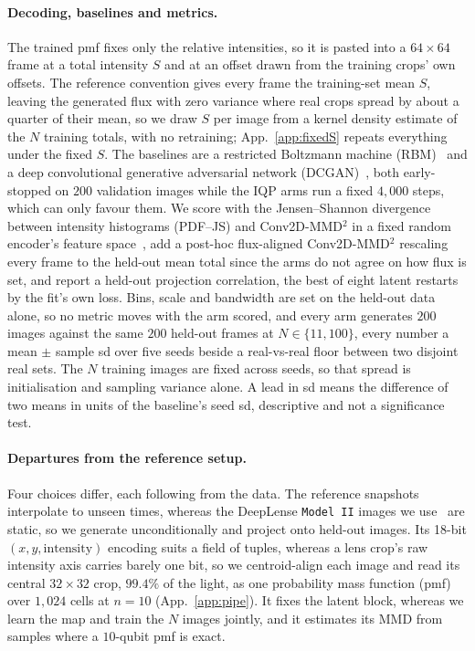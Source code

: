 \documentclass{article}
\begin{document}
\paragraph{Decoding, baselines and metrics.}
The trained pmf fixes only the relative intensities, so it is pasted into a $64\times64$ frame at a
total intensity $S$ and at an offset drawn from the training crops' own offsets. The reference
convention gives every frame the training-set mean $S$, leaving the generated flux with zero variance
where real crops spread by about a quarter of their mean, so we draw $S$ per image from a kernel
density estimate of the $N$ training totals, with no retraining;
App.~\ref{app:fixedS} repeats everything under the fixed $S$. The baselines are a restricted Boltzmann machine
(RBM)~\cite{smolensky_1986_information,hinton_2002_training,tieleman_2008_training} and a deep convolutional generative
adversarial network (DCGAN)~\cite{radford_2015_unsupervised}, both early-stopped on $200$ validation
images while the IQP arms run a fixed $4{,}000$ steps, which can only favour them. We score with the
Jensen--Shannon divergence between intensity histograms (PDF--JS) and Conv2D-MMD$^2$ in a fixed
random encoder's feature space~\cite{gretton_2012_kernel,binkowski_2018_demystifying}, add a
post-hoc flux-aligned
Conv2D-MMD$^2$ rescaling every frame to the held-out mean total since the arms do not agree on how
flux is set, and report a held-out projection correlation, the best of eight latent restarts by the
fit's own loss. Bins, scale and bandwidth are set on the held-out data alone, so no metric moves with the arm scored, and every arm generates $200$ images against the
same $200$ held-out frames at $N \in \{11,100\}$, every number a mean $\pm$ sample sd over five seeds
beside a real-vs-real floor between two disjoint real sets. The $N$
training images are fixed across seeds, so that spread is initialisation and sampling variance alone.
A lead in sd means the difference of two means in units of the baseline's seed sd, descriptive and
not a significance test.

\paragraph{Departures from the reference setup.}
Four choices differ, each following from the data. The reference snapshots interpolate to unseen
times, whereas the DeepLense \texttt{Model~II} images we use~\cite{ml4sci_deeplense} are static, so we
generate unconditionally and project onto held-out images. Its 18-bit $(x,y,\mathrm{intensity})$
encoding suits a field of tuples, whereas a lens crop's raw intensity axis carries barely one bit, so
we centroid-align each image and read its central $32\times32$ crop, $99.4\%$ of the light, as one
probability mass function (pmf) over $1{,}024$ cells at $n=10$ (App.~\ref{app:pipe}). It fixes the
latent block, whereas we learn the map and train the $N$ images jointly, and it estimates its MMD
from samples where a $10$-qubit pmf is exact.
\end{document}

